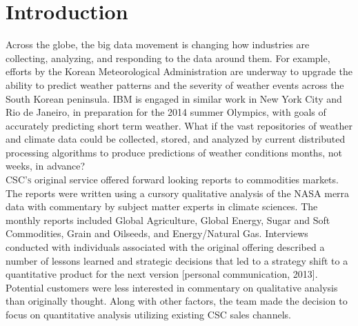 \section{Introduction}
Across the globe, the big data movement is changing how industries are collecting, analyzing, and responding to the data around them. For example, efforts by the Korean Meteorological Administration are underway to upgrade the ability to predict weather patterns and the severity of weather events across the South Korean peninsula. IBM is engaged in similar work in New York City and Rio de Janeiro, in preparation for the 2014 summer Olympics, with goals of accurately predicting short term weather\cite{rwe}. What if the vast repositories of weather and climate data could be collected, stored, and analyzed by current distributed processing algorithms to produce predictions of weather conditions months, not weeks, in advance?\\

\textsc{CSC's} original \climatedge service offered forward looking reports to commodities markets. The reports were written using  a cursory qualitative analysis of the NASA \gls{merra} data with commentary by subject matter experts in climate sciences. The monthly reports included Global Agriculture, Global Energy, Sugar and Soft Commodities, Grain and Oilseeds, and Energy/Natural Gas\cite{climatedgeurl}. Interviews conducted with  individuals associated with the original \climatedge offering described a number of lessons learned and strategic decisions that led to a strategy shift to a quantitative product for the next version [personal communication, 2013]. Potential customers were less interested in commentary on qualitative analysis than originally thought. Along with other factors, the \climatedge team made the decision to focus on quantitative analysis utilizing existing CSC sales channels. \\

